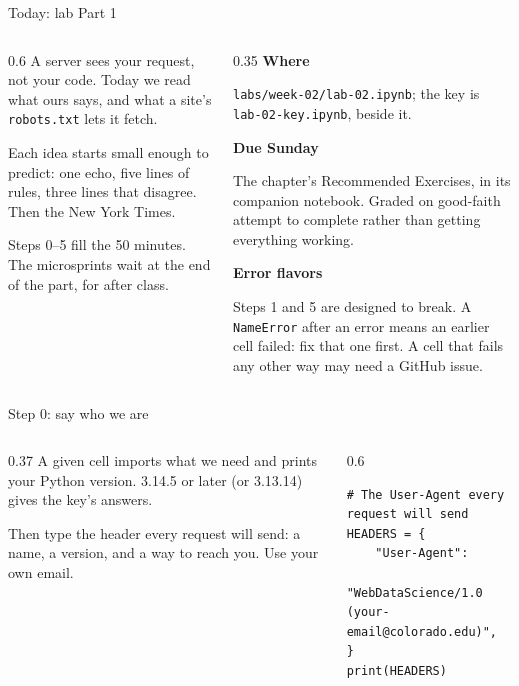 \documentclass[9pt,aspectratio=169]{beamer}
\begin{document}
\begin{frame}{Today: lab Part 1}
    \begin{columns}[T]
        \begin{column}{0.6\textwidth}
            A server sees your request, not your code. Today we read what ours says, and what a site's \texttt{robots.txt} lets it fetch.

            \medskip
            Each idea starts small enough to predict: one echo, five lines of rules, three lines that disagree. Then the New York Times.

            \medskip
            Steps 0--5 fill the 50 minutes. The microsprints wait at the end of the part, for after class.
        \end{column}
        \begin{column}{0.35\textwidth}
            \textbf{Where}\\[2pt]
            {\footnotesize \texttt{labs/week-02/lab-02.ipynb}; the key is \texttt{lab-02-key.ipynb}, beside it.\par}
            \medskip
            \textbf{Due Sunday}\\[2pt]
            {\footnotesize The chapter's Recommended Exercises, in its companion notebook. Graded on good-faith attempt to complete rather than getting everything working.\par}
            \medskip
            \textbf{Error flavors}\\[2pt]
            {\footnotesize Steps 1 and 5 are designed to break. A \texttt{NameError} after an error means an earlier cell failed: fix that one first. A cell that fails any other way may need a GitHub issue.\par}
        \end{column}
    \end{columns}
\end{frame}

\begin{frame}[fragile]{Step 0: say who we are}
    \begin{columns}[T]
        \begin{column}{0.37\textwidth}
            A given cell imports what we need and prints your Python version. 3.14.5 or later (or 3.13.14) gives the key's answers.

            \medskip
            Then type the header every request will send: a name, a version, and a way to reach you. Use your own email.
        \end{column}
        \begin{column}{0.6\textwidth}
\begin{lstlisting}[basicstyle=\ttfamily\footnotesize]
# The User-Agent every request will send
HEADERS = {
    "User-Agent":
        "WebDataScience/1.0 (your-email@colorado.edu)",
}
print(HEADERS)
\end{lstlisting}
        \end{column}
    \end{columns}
\end{frame}
\end{document}

